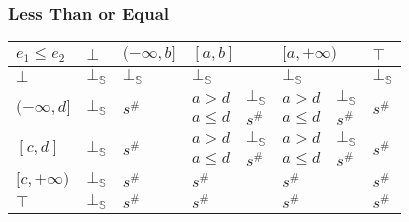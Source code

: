\documentclass[aspectratio=169]{beamer}
\begin{document}
    
        \begin{frame}
            \frametitle{Less Than or Equal}
    \begin{table}[]
        \begin{tabular}{|l|l|l|ll|ll|l|}
        \hline
        $e_1 \le e_2$                   & $\bot$                  & $(-\infty, b]$          & \multicolumn{2}{l|}{$[a, b]$} & \multicolumn{2}{l|}{$[a, +\infty)$} & $\top$                  \\ \hline
        $\bot$                          & $\bot_\mathbb{S}$                  & $\bot_\mathbb{S}$                  & \multicolumn{2}{l|}{$\bot_\mathbb{S}$}   & \multicolumn{2}{l|}{$\bot_\mathbb{S}$}         & $\bot_\mathbb{S}$                  \\ \hline
        \multirow{2}{*}{$(-\infty, d]$} & \multirow{2}{*}{$\bot_\mathbb{S}$} & \multirow{2}{*}{$s^\#$} & $a > d$         & $\bot_\mathbb{S}$      & $a > d$            & $\bot_\mathbb{S}$         & \multirow{2}{*}{$s^\#$} \\
                                        &                         &                         & $a \le d$       & $s^\#$      & $a \le d$          & $s^\#$         &                         \\ \hline
        \multirow{2}{*}{$[c, d]$}       & \multirow{2}{*}{$\bot_\mathbb{S}$} & \multirow{2}{*}{$s^\#$} & $a > d$         & $\bot_\mathbb{S}$      & $a > d$            & $\bot_\mathbb{S}$         & \multirow{2}{*}{$s^\#$} \\
                                        &                         &                         & $a \le d$       & $s^\#$      & $a \le d$          & $s^\#$         &                         \\ \hline
        $[c, +\infty)$                  & $\bot_\mathbb{S}$                  & $s^\#$                  & \multicolumn{2}{l|}{$s^\#$}   & \multicolumn{2}{l|}{$s^\#$}         & $s^\#$                  \\ \hline
        $\top$                          & $\bot_\mathbb{S}$                  & $s^\#$                  & \multicolumn{2}{l|}{$s^\#$}   & \multicolumn{2}{l|}{$s^\#$}         & $s^\#$                  \\ \hline
        \end{tabular}
        \end{table}
    \end{frame}
    
\end{document}
